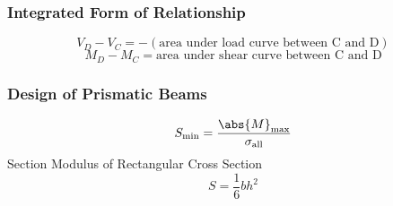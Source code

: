\documentclass[10pt,landscape]{article}
\newenvironment{Figure}
     {\par\medskip\noindent\minipage{\linewidth}}
     {\endminipage\par\medskip}
\begin{document}
\begin{multicols}{3}
\subsubsection{Integrated Form of Relationship}
\begin{equation}
    V_D-V_C=-(\text{area under load curve between C and D})
\end{equation}
\begin{equation}
    M_D-M_C=\text{area under shear curve between C and D}
\end{equation}
\subsubsection{Design of Prismatic Beams}
\begin{equation}
    S_\text{min}=\frac{\abs{M}_\text{max}}{\sigma_\text{all}}
\end{equation}
Section Modulus of Rectangular Cross Section
\begin{equation}
    S=\frac{1}{6}bh^2
\end{equation}


%
%

\end{multicols}
\end{document}
